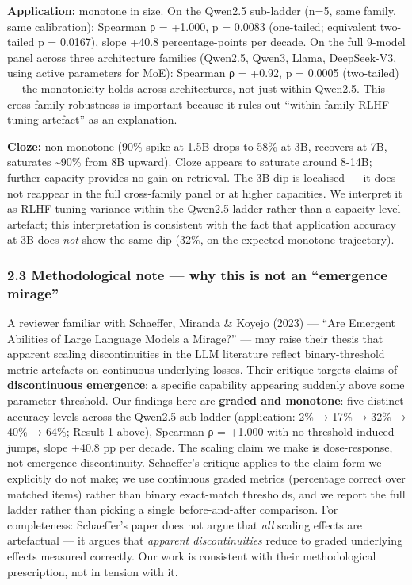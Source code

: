 \documentclass[
]{article}
\begin{document}
\textbf{Application:} monotone in size. On the Qwen2.5 sub-ladder (n=5,
same family, same calibration): Spearman ρ = +1.000, p = 0.0083
(one-tailed; equivalent two-tailed p = 0.0167), slope +40.8
percentage-points per decade. On the full 9-model panel across three
architecture families (Qwen2.5, Qwen3, Llama, DeepSeek-V3, using active
parameters for MoE): Spearman ρ = +0.92, p = 0.0005 (two-tailed) --- the
monotonicity holds across architectures, not just within Qwen2.5. This
cross-family robustness is important because it rules out
``within-family RLHF-tuning-artefact'' as an explanation.

\textbf{Cloze:} non-monotone (90\% spike at 1.5B drops to 58\% at 3B,
recovers at 7B, saturates \textasciitilde90\% from 8B upward). Cloze
appears to saturate around 8-14B; further capacity provides no gain on
retrieval. The 3B dip is localised --- it does not reappear in the full
cross-family panel or at higher capacities. We interpret it as
RLHF-tuning variance within the Qwen2.5 ladder rather than a
capacity-level artefact; this interpretation is consistent with the fact
that application accuracy at 3B does \emph{not} show the same dip (32\%,
on the expected monotone trajectory).

\subsubsection{2.3 Methodological note --- why this is not an
``emergence
mirage''}\label{methodological-note-why-this-is-not-an-emergence-mirage}

A reviewer familiar with Schaeffer, Miranda \& Koyejo (2023) --- ``Are
Emergent Abilities of Large Language Models a Mirage?'' --- may raise
their thesis that apparent scaling discontinuities in the LLM literature
reflect binary-threshold metric artefacts on continuous underlying
losses. Their critique targets claims of \textbf{discontinuous
emergence}: a specific capability appearing suddenly above some
parameter threshold. Our findings here are \textbf{graded and monotone}:
five distinct accuracy levels across the Qwen2.5 sub-ladder
(application: 2\% → 17\% → 32\% → 40\% → 64\%; Result 1 above), Spearman
ρ = +1.000 with no threshold-induced jumps, slope +40.8 pp per decade.
The scaling claim we make is dose-response, not emergence-discontinuity.
Schaeffer's critique applies to the claim-form we explicitly do not
make; we use continuous graded metrics (percentage correct over matched
items) rather than binary exact-match thresholds, and we report the full
ladder rather than picking a single before-and-after comparison. For
completeness: Schaeffer's paper does not argue that \emph{all} scaling
effects are artefactual --- it argues that \emph{apparent
discontinuities} reduce to graded underlying effects measured correctly.
Our work is consistent with their methodological prescription, not in
tension with it.
\end{document}
